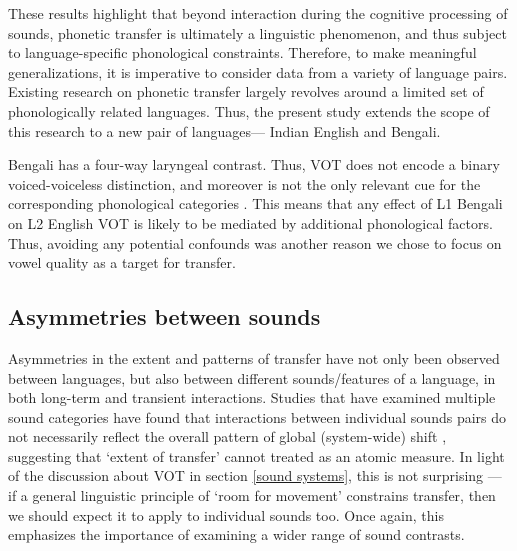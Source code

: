\documentclass[12 pt]{article}
\begin{document}
These results highlight that beyond interaction during the cognitive processing of sounds, phonetic transfer is ultimately a linguistic phenomenon, and thus subject to language-specific phonological constraints. Therefore, to make meaningful generalizations, it is imperative to consider data from a variety of language pairs. Existing research on phonetic transfer largely revolves around a limited set of phonologically related languages. Thus, the present study extends the scope of this research to a new pair of languages--- Indian English and Bengali.

Bengali has a four-way laryngeal contrast. Thus, VOT does not encode a binary voiced-voiceless distinction, and moreover is not the only relevant cue for the corresponding phonological categories \citep{dmitrieva2020acoustic}. This means that any effect of L1 Bengali on L2 English VOT is likely to be mediated by additional phonological factors. Thus, avoiding any potential confounds was another reason we chose to focus on vowel quality as a target for transfer. 


\subsection{Asymmetries between sounds}\label{asymmetry between sounds}

Asymmetries in the extent and patterns of transfer have not only been observed between languages, but also between different sounds/features of a language, in both long-term and transient interactions. Studies that have examined multiple sound categories have found that interactions between individual sounds pairs do not necessarily reflect the overall pattern of global (system-wide) shift \citep[e.g.][]{chang2012rapid,elias2017effects}, suggesting that `extent of transfer' cannot treated as an atomic measure. In light of the discussion about VOT in section \ref{sound systems}, this is not surprising --- if a general linguistic principle of `room for movement' constrains transfer, then we should expect it to apply to individual sounds too. Once again, this emphasizes the importance of examining a wider range of sound contrasts.
\end{document}
